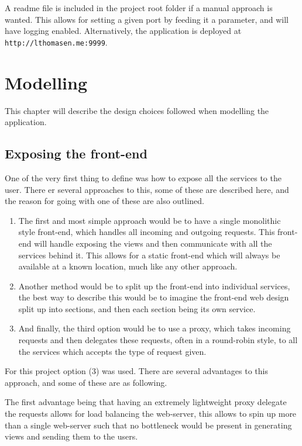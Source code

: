 \documentclass[a4paper,11pt,oneside]{book}
\begin{document}
A readme file is included in the project root folder if a manual approach is wanted. This allows for setting a given port by feeding it a parameter, and will have logging enabled. Alternatively, the application is deployed at \texttt{http://lthomasen.me:9999}.

%
%
\chapter{Modelling}
This chapter will describe the design choices followed when modelling the application.

\section{Exposing the front-end}
One of the very first thing to define was how to expose all the services to the user. There er several approaches to this, some of these are described here, and the reason for going with one of these are also outlined.

\begin{enumerate}
\item The first and most simple approach would be to have a single monolithic style front-end, which handles all incoming and outgoing requests. This front-end will handle exposing the views and then communicate with all the services behind it. This allows for a static front-end which will always be available at a known location, much like any other approach.

\item Another method would be to split up the front-end into individual services, the best way to describe this would be to imagine the front-end web design split up into sections, and then each section being its own service.

\item And finally, the third option would be to use a proxy, which takes incoming requests and then delegates these requests, often in a round-robin style, to all the services which accepts the type of request given.
\end{enumerate}

For this project option (3) was used. There are several advantages to this approach, and some of these are as following.

The first advantage being that having an extremely lightweight proxy delegate the requests allows for load balancing the web-server, this allows to spin up more than a single web-server such that no bottleneck would be present in generating views and sending them to the users.
\end{document}
